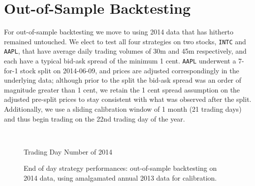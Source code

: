 \FloatBarrier
\section{Out-of-Sample Backtesting}

For out-of-sample backtesting we move to using 2014 data that has hitherto remained untouched. We elect to test all four strategies on two stocks, \texttt{INTC} and \texttt{AAPL}, that have average daily trading volumes of 30m and 45m respectively, and each have a typical bid-ask spread of the minimum 1 cent. \texttt{AAPL} underwent a 7-for-1 stock split on 2014-06-09, and prices are adjusted correspondingly in the underlying data; although prior to the split the bid-ask spread was an order of magnitude greater than 1 cent, we retain the 1 cent spread assumption on the adjusted pre-split prices to stay consistent with what was observed after the split. Additionally, we use a sliding calibration window of 1 month (21 trading days) and thus begin trading on the 22nd trading day of the year. 

\begin{figure}
\centering
\begin{subfigure}{.45\linewidth}
  \centering
  \setlength\figureheight{\linewidth} 
  \setlength\figurewidth{\linewidth}
  
\end{subfigure}%
\hfill%
\begin{subfigure}{.45\linewidth}
  \centering
  \setlength\figureheight{\linewidth} 
  \setlength\figurewidth{\linewidth}
   
\end{subfigure}\\

\leavevmode{}\hspace{0pt plus 1filll}\null

Trading Day Number of 2014

\vspace{1cm}
\begin{subfigure}{\linewidth}
  \setlength\figureheight{\linewidth} 
  \setlength\figurewidth{\linewidth}
  \resizebox{\linewidth}{!}{}
\end{subfigure}%
  \caption[Out-of-sample backtesting performance using annual calibration]{End of day strategy performances: out-of-sample backtesting on 2014 data, using amalgamated annual 2013 data for calibration.}
  \label{fig:OOS_annual_comp}
\end{figure}


